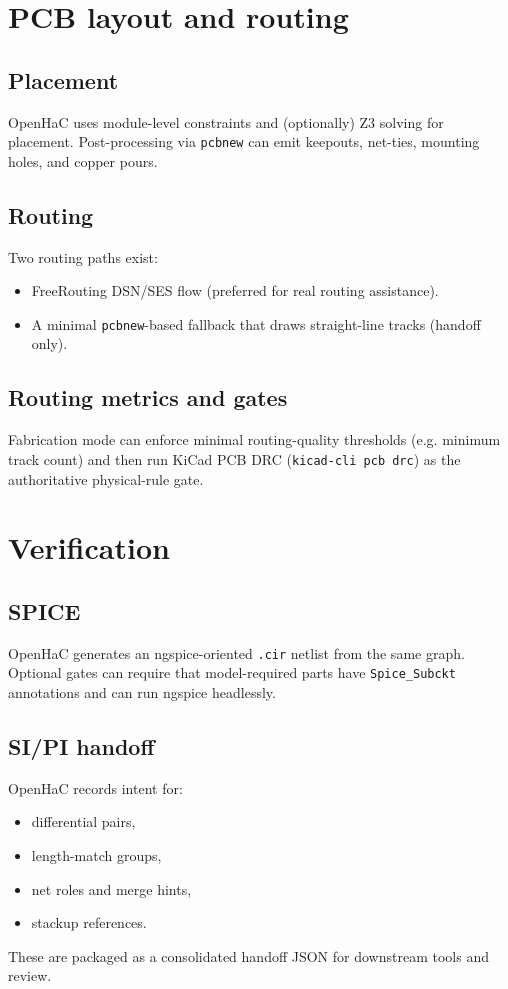 \documentclass[11pt]{report}
\begin{document}
\chapter{PCB layout and routing}

\section{Placement}
OpenHaC uses module-level constraints and (optionally) Z3 solving for placement.
Post-processing via \texttt{pcbnew} can emit keepouts, net-ties, mounting holes, and copper pours.

\section{Routing}
Two routing paths exist:
\begin{itemize}
  \item FreeRouting DSN/SES flow (preferred for real routing assistance).
  \item A minimal \texttt{pcbnew}-based fallback that draws straight-line tracks (handoff only).
\end{itemize}

\section{Routing metrics and gates}
Fabrication mode can enforce minimal routing-quality thresholds (e.g. minimum track count) and then run KiCad PCB DRC
(\texttt{kicad-cli pcb drc}) as the authoritative physical-rule gate.

\chapter{Verification}

\section{SPICE}
OpenHaC generates an ngspice-oriented \texttt{.cir} netlist from the same graph.
Optional gates can require that model-required parts have \texttt{Spice\_Subckt} annotations and can run ngspice headlessly.

\section{SI/PI handoff}
OpenHaC records intent for:
\begin{itemize}
  \item differential pairs,
  \item length-match groups,
  \item net roles and merge hints,
  \item stackup references.
\end{itemize}
These are packaged as a consolidated handoff JSON for downstream tools and review.
\end{document}
